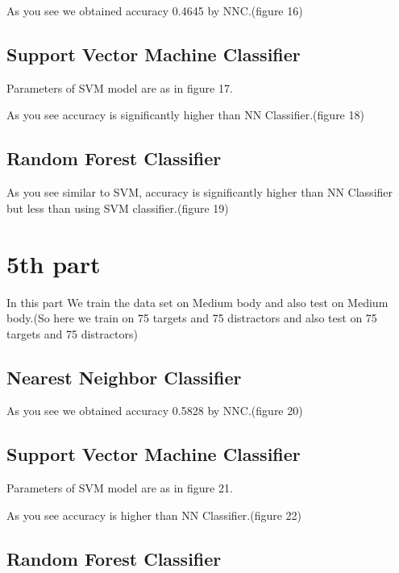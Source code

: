 \documentclass[9pt,twocolumn]{paper-template}
\begin{document}
As you see we obtained accuracy 0.4645 by NNC.(figure 16)

\subsection*{Support Vector Machine Classifier}
Parameters of SVM model are as in figure 17.



As you see accuracy is significantly higher than NN Classifier.(figure 18)

\subsection*{Random Forest Classifier}



As you see similar to SVM, accuracy is significantly higher than NN Classifier but less than using SVM
classifier.(figure 19)






\section*{5th part}





In this part We train the data set on Medium body and also test on Medium body.(So here we train on 75 targets and 75 distractors and also test on 75 targets and 75 distractors)




\subsection*{Nearest Neighbor Classifier}




As you see we obtained accuracy 0.5828 by NNC.(figure 20)

\subsection*{Support Vector Machine Classifier}
Parameters of SVM model are as in figure 21.



As you see accuracy is higher than NN Classifier.(figure 22)

\subsection*{Random Forest Classifier}
\end{document}
